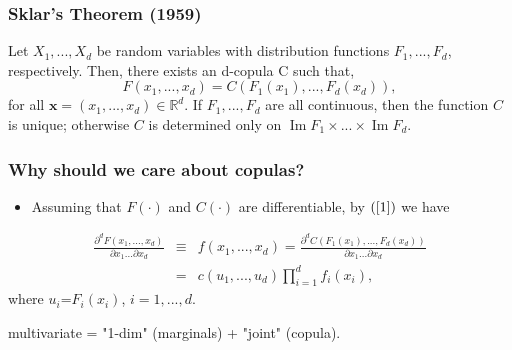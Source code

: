 \documentclass[pdf,10pt,xcolor=dvipsnames,hide notes]{beamer}
\DeclareMathOperator{\Ima}{Im}
\begin{document}
\begin{frame}[label=frame1c2]
\frametitle{Sklar's Theorem (1959)}


\begin{theorem}
	Let $X_{1},...,X_{d}$ be random variables with distribution functions $F_{1},...,F_{d}$, respectively. Then, there exists an d-copula C such that,
	\begin{equation}
	F\left( x_{1},...,x_{d}\right) =C\left( F_{1}\left( x_{1}\right)
	,...,F_{d}\left( x_{d}\right) \right) ,  \label{1} 
	\end{equation}
	\noindent for all $\mathbf{x}=\left( x_{1},...,x_{d}\right) \in
	\mathbb{R}^{d}$. If $F_{1},...,F_{d}$ are all continuous, then the function $C$ is unique; otherwise $C$ is determined only on $\Ima F_{1}\times ...\times \Ima F_{d}$. 
\end{theorem}

\end{frame}

\begin{frame}[label=frame2]
\frametitle{Why should we care about copulas?}


\begin{itemize}
\justifying

\item Assuming that $F\left( \cdot \right) $ and $C\left( \cdot
\right) $ are differentiable, by $\left( \ref{1}\right)$ we have

\end{itemize}

\begin{eqnarray}
\frac{\partial ^{d}F\left( x_{1},...,x_{d}\right) }{\partial
x_{1}...\partial x_{d}} &\equiv &f\left( x_{1},...,x_{d}\right) =\frac{
\partial ^{d}C\left( F_{1}\left( x_{1}\right) ,...,F_{d}\left( x_{d}\right)
\right) }{\partial x_{1}...\partial x_{d}} \\
&=&c\left( u_{1},...,u_{d}\right) \prod_{i=1}^{d}f_{i}\left( x_{i}\right),
\label{23}
\end{eqnarray}%
where $u_{i}$=$F_{i}\left( x_{i}\right) $, $i=1,...,d$.

\vspace{0.3cm}

\begin{exampleblock}{}
\centering
multivariate = "1-dim" (marginals) + "joint" (copula).	
\end{exampleblock}

\end{frame}
\end{document}

